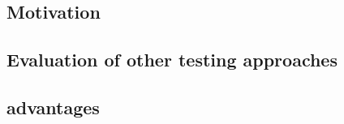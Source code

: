 

\subsection{Motivation}


\subsection{Evaluation of other testing approaches}


\subsection{\gd {} advantages}

